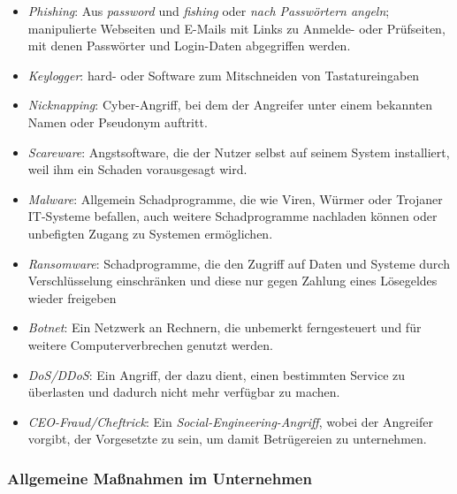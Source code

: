 \documentclass[a4paper, 12pt]{report}
\begin{document}
\begin{itemize}
    \item \emph{Phishing}: Aus \emph{password} und \emph{fishing} oder
    \emph{nach Passwörtern angeln}; manipulierte Webseiten und E-Mails mit Links
    zu Anmelde- oder Prüfseiten, mit denen Passwörter und Login-Daten
    abgegriffen werden.
    \item \emph{Keylogger}: hard- oder Software zum Mitschneiden von
    Tastatureingaben
    \item \emph{Nicknapping}: Cyber-Angriff, bei dem der Angreifer unter einem
    bekannten Namen oder Pseudonym auftritt.
    \item \emph{Scareware}: Angstsoftware, die der Nutzer selbst auf seinem
    System installiert, weil ihm ein Schaden vorausgesagt wird.
    \item \emph{Malware}: Allgemein Schadprogramme, die wie Viren, Würmer oder
    Trojaner IT-Systeme befallen, auch weitere Schadprogramme nachladen können
    oder unbefigten Zugang zu Systemen ermöglichen.
    \item \emph{Ransomware}: Schadprogramme, die den Zugriff auf Daten und
    Systeme durch Verschlüsselung einschränken und diese nur gegen Zahlung eines
    Lösegeldes wieder freigeben
    \item \emph{Botnet}: Ein Netzwerk an Rechnern, die unbemerkt ferngesteuert
    und für weitere Computerverbrechen genutzt werden.
    \item \emph{DoS/DDoS}: Ein Angriff, der dazu dient, einen bestimmten Service
    zu überlasten und dadurch nicht mehr verfügbar zu machen.
    \item  \emph{CEO-Fraud/Cheftrick}: Ein \emph{Social-Engineering-Angriff},
    wobei der Angreifer vorgibt, der Vorgesetzte zu sein, um damit Betrügereien
    zu unternehmen.
\end{itemize}

\subsubsection{Allgemeine Maßnahmen im Unternehmen}
\end{document}
